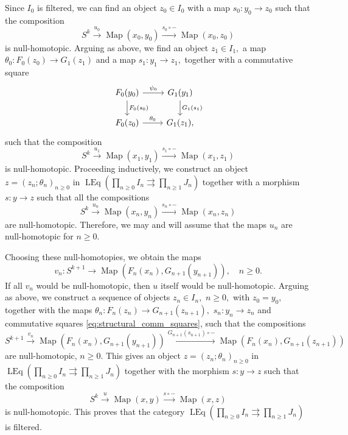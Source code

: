 \documentclass[11pt,leqno]{amsart}
\numberwithin{equation}{section}
\def\Map{\operatorname{Map}}
\newcommand{\prodd}[1][]{\mathop{\prod}\limits_{#1}}
\newcommand{\toto}{\rightrightarrows}
\newcommand{\xto}{\xrightarrow}
\newcommand{\LEq}{\operatorname{LEq}}
\begin{document}
	Since $I_0$ is filtered, we can find an object $z_0\in I_0$ with a map $s_0:y_0\to z_0$ such that the composition
	\begin{equation*}
		S^k\xto{u_0}\Map(x_0,y_0)\xto{s_0\circ-}\Map(x_0,z_0)\end{equation*} 
	is null-homotopic. Arguing as above, we find an object $z_1\in I_1,$ a map $\theta_0:F_0(z_0)\to G_1(z_1)$ and a map $s_1:y_1\to z_1,$ together with a commutative square
	\begin{equation}\label{eq:structural_comm_squares}
		\begin{tikzcd}
			F_0(y_0) \ar[r, "\psi_0"] \ar[d, "F_0(s_0)"] & G_1(y_1) \ar[d, "G_1(s_1)"] \\
			F_0(z_0)\ar[r, "\theta_0"] & G_1(z_1),
		\end{tikzcd}
	\end{equation}
	such that the composition 
	\begin{equation*}
		S^k\xto{u_1}\Map(x_1,y_1)\xto{s_1\circ-}\Map(x_1,z_1)\end{equation*} 
	is null-homotopic. Proceeding inductively, we construct an object $z=(z_n;\theta_n)_{n\geq 0}$ in $\LEq(\prodd[n\geq 0]I_n\toto\prodd[n\geq 1]J_n)$ together with a morphism $s:y\to z$ such that all the compositions
	\begin{equation*}
		S^k\xto{u_n}\Map(x_n,y_n)\xto{s_n\circ-}\Map(x_n,z_n)\end{equation*}
	are null-homotopic. Therefore, we may and will assume that the maps $u_n$ are null-homotopic for $n\geq 0.$
	
	Choosing these null-homotopies, we obtain the maps 
	\begin{equation*}v_n:S^{k+1}\to \Map(F_n(x_n),G_{n+1}(y_{n+1})),\quad n\geq 0.
	\end{equation*}
	If all $v_n$ would be null-homotopic, then $u$ itself would be null-homotopic. Arguing as above, we construct a sequence of objects $z_n\in I_n,$ $n\geq 0,$ with $z_0=y_0,$ together with the maps $\theta_n:F_n(z_n)\to G_{n+1}(z_{n+1}),$ $s_n:y_n\to z_n$ and commutative squares
	\eqref{eq:structural_comm_squares}, such that the compositions
	\begin{equation*}
		S^{k+1}\xto{v_n}\Map(F_n(x_n),G_{n+1}(y_{n+1}))\xto{G_{n+1}(s_{n+1})\circ-}\Map(F_n(x_n),G_{n+1}(z_{n+1}))
	\end{equation*}
	are null-homotopic, $n\geq 0.$ This gives an object $z=(z_n;\theta_n)_{n\geq 0}$ in $\LEq(\prodd[n\geq 0]I_n\toto\prodd[n\geq 1]J_n)$ together with the morphism $s:y\to z$ such that the composition
	\begin{equation*}
		S^k\xto{u}\Map(x,y)\xto{s\circ-}\Map(x,z)
	\end{equation*}
	is null-homotopic. This proves that the category $\LEq(\prodd[n\geq 0]I_n\toto\prodd[n\geq 1]J_n)$ is filtered.
\end{document}

